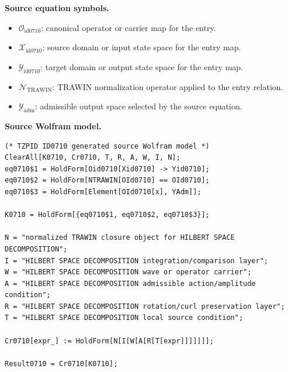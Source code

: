 \begin{minipage}[t]{0.49\linewidth}
\begingroup
\small
\raggedright
\textbf{Source equation symbols.}\par
\begin{itemize}[leftmargin=1.35em,itemsep=1pt,topsep=1pt,parsep=0pt]
    \item $\mathcal{O}_{\mathrm{id0710}}$: canonical operator or carrier map for the entry.
    \item $\mathcal{X}_{\mathrm{id0710}}$: source domain or input state space for the entry map.
    \item $\mathcal{Y}_{\mathrm{id0710}}$: target domain or output state space for the entry map.
    \item $\mathcal{N}_{\mathrm{TRAWIN}}$: TRAWIN normalization operator applied to the entry relation.
    \item $\mathcal{Y}_{\mathrm{adm}}$: admissible output space selected by the source equation.
\end{itemize}
\endgroup
\end{minipage}\hfill
\begin{minipage}[t]{0.47\linewidth}
\begingroup
\scriptsize
\raggedright
\textbf{Source Wolfram model.}\par
\begin{Verbatim}[fontsize=\tiny,breaklines=true,breakanywhere=true]
(* TZPID ID0710 generated source Wolfram model *)
ClearAll[K0710, Cr0710, T, R, A, W, I, N];
eq0710$1 = HoldForm[Oid0710[Xid0710] -> Yid0710];
eq0710$2 = HoldForm[NTRAWIN[OId0710] == OId0710];
eq0710$3 = HoldForm[Element[OId0710[x], YAdm]];

K0710 = HoldForm[{eq0710$1, eq0710$2, eq0710$3}];

N = "normalized TRAWIN closure object for HILBERT SPACE DECOMPOSITION";
I = "HILBERT SPACE DECOMPOSITION integration/comparison layer";
W = "HILBERT SPACE DECOMPOSITION wave or operator carrier";
A = "HILBERT SPACE DECOMPOSITION admissible action/amplitude condition";
R = "HILBERT SPACE DECOMPOSITION rotation/curl preservation layer";
T = "HILBERT SPACE DECOMPOSITION local source condition";

Cr0710[expr_] := HoldForm[N[I[W[A[R[T[expr]]]]]]];

Result0710 = Cr0710[K0710];
\end{Verbatim}
\endgroup
\end{minipage}

